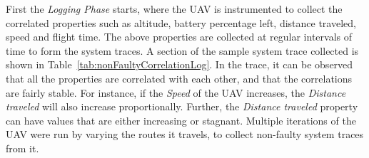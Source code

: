 First the \textit{Logging Phase} starts, where the \ac{UAV} is instrumented to collect the correlated properties such as altitude, battery percentage left, distance traveled, speed and flight time. The above properties are collected at regular intervals of time to form the system traces. A section of the sample system trace collected is shown in Table~\ref{tab:nonFaultyCorrelationLog}. In the trace, it can be observed that all the properties are correlated  with each other, and that the correlations are fairly stable. For instance, if the \textit{Speed} of the \ac{UAV} increases, the \textit{Distance traveled} will also increase proportionally. Further, the \textit{Distance traveled} property can have values that are either increasing or stagnant. Multiple iterations of the \ac{UAV} were run by varying the routes it travels, to collect non-faulty system traces from it.

\begin{table}
\centering
  \caption{Slice of a non-faulty system trace obtained while flying an UAV on a random route}
  \label{tab:nonFaultyCorrelationLog}
\end{table}

